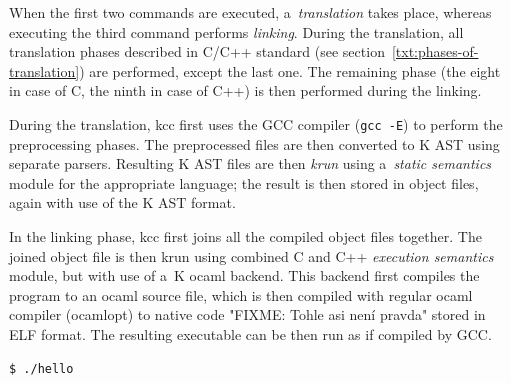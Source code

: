 \documentclass[nolot,nolof,nocover,printed]{fithesis3}
\begin{document}
When the first two commands are executed, a~\textit{translation} takes place, whereas executing the third command performs \textit{linking}. During the translation, all translation phases described in C/C++ standard (see section~\ref{txt:phases-of-translation}) are performed, except the last one. The remaining phase (the eight in case of C, the ninth in case of C++) is then performed during the linking.

During the translation, kcc first uses the GCC compiler (\lstinline|gcc -E|) to perform the preprocessing phases. The preprocessed files are then converted to K AST using separate parsers. Resulting K AST files are then \textit{krun} using a~\textit{static semantics} module for the appropriate language; the result is then stored in object files, again with use of the K AST format.

In the linking phase, kcc first joins all the compiled object files together. The joined object file is then krun using combined C and C++ \textit{execution semantics} module, but with use of a~K ocaml backend. This backend first compiles the program to an ocaml source file, which is then compiled with regular ocaml compiler (ocamlopt) to native code "FIXME: Tohle asi není pravda" stored in ELF format. The resulting executable can be then run as if compiled by GCC.

\begin{lstlisting}
$ ./hello
\end{lstlisting}




\end{document}
